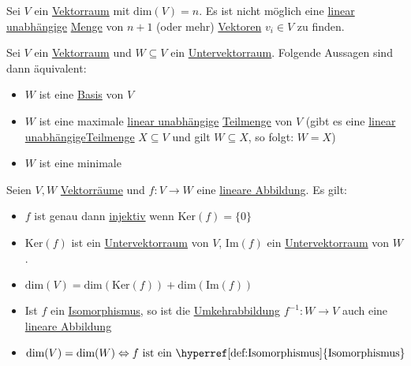\documentclass[../../main.tex]{subfiles}
\begin{document}
	\begin{theorem}
		Sei $V$ ein \hyperref[def:Vektorraum]{Vektorraum} mit $\textrm{dim}(V)=n$. Es ist nicht möglich eine \hyperref[def:LineareUnabhängigkeitMenge]{linear unabhängige} \hyperref[def:Menge]{Menge} von $n+1$ (oder mehr) \hyperref[def:Vektor]{Vektoren} $v_i \in V$ zu finden.
	\end{theorem}

	\begin{theorem}
		Sei $V$ ein \hyperref[def:Vektorraum]{Vektorraum} und $W \subseteq V$ ein \hyperref[def:Untervektorraum]{Untervektorraum}. Folgende Aussagen sind dann äquivalent:
		\begin{itemize}
			\item $W$ ist eine \hyperref[def:Basis]{Basis} von $V$
			\item $W$ ist eine maximale \hyperref[def:LineareUnabhängigkeitMenge]{linear unabhängige} \hyperref[def:Teilmenge]{Teilmenge} von $V$ (gibt es eine \hyperref[def:LineareUnabhängigkeitMenge]{linear unabhängige}\hyperref[def:Teilmenge]{Teilmenge} $X \subseteq V$ und gilt $W \subseteq X$, so folgt: $W = X$)
			\item $W$ ist eine minimale 
		\end{itemize}
	\end{theorem}

	\begin{theorem}
		Seien $V, W$ \hyperref[def:Vektorraum]{Vektorräume} und $f: V \rightarrow W$ eine \hyperref[def:LineareAbbildung]{lineare Abbildung}. Es gilt:
		\begin{itemize}
			\item $f$ ist genau dann \hyperref[def:Injektiv]{injektiv} wenn $\textrm{Ker}(f)=\{0\}$
			\item $\textrm{Ker}(f)$ ist ein \hyperref[def:Untervektorraum]{Untervektorraum} von $V$, $\textrm{Im}(f)$ ein \hyperref[def:Untervektorraum]{Untervektorraum} von $W$. 
			\item $\textrm{dim}(V) = \textrm{dim}(\textrm{Ker}(f)) + \textrm{dim}(\textrm{Im}(f))$
			\item Ist $f$ ein \hyperref[def:Isomorphismus]{Isomorphismus}, so ist die \hyperref[def:Umkehrabbildung]{Umkehrabbildung} $f^{-1}: W \rightarrow V$ auch eine \hyperref[def:LineareAbbildung]{lineare Abbildung}
			\item $\textrm{dim}(V)=\textrm{dim}(W) \Leftrightarrow f \textrm{ ist ein \hyperref[def:Isomorphismus]{Isomorphismus}}$
		\end{itemize}
	\end{theorem}
\end{document}

